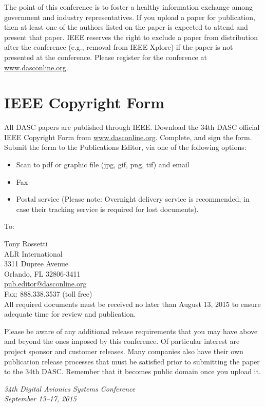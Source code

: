 \documentclass{dasc}
\begin{document}
The point of this conference is to foster a healthy information exchange among government and industry representatives.  If you upload a paper for publication, then at least one of the authors listed on the paper is expected to attend and present that paper.  IEEE reserves the right to exclude a paper from distribution after the conference (e.g., removal from IEEE Xplore) if the paper is not presented at the conference.  Please register for the conference at \url{www.dasconline.org}.

\section*{IEEE Copyright Form}

All DASC papers are published through IEEE.  Download the 34th DASC official IEEE Copyright Form from \url{www.dasconline.org}. Complete, and sign the form. Submit the form to the Publications Editor, via one of the following options: 
\begin{itemize}
\item Scan to pdf or graphic file (jpg, gif, png, tif) and email
\item Fax
\item Postal service (Please note: Overnight delivery service is recommended; in case their tracking service is required for lost documents).
\end{itemize}

\noindent To:

\noindent Tony Rossetti\\
ALR International\\
3311 Dupree Avenue\\
Orlando, FL 32806-3411\\
\url{pub.editor@dasconline.org}\\
Fax: 888.338.3537 (toll free)\\

All required documents must be received no later than August 13, 2015 to ensure adequate time for review and publication.

Please be aware of any additional release requirements that you may have above and beyond the ones imposed by this conference.  Of particular interest are project sponsor and customer releases.  Many companies also have their own publication release processes that must be satisfied prior to submitting the paper to the 34th DASC.  Remember that it becomes public domain once you upload it.

\printbibliography

\vspace{1cm}
\centering
\emph{\large 34th Digital Avionics Systems Conference\\September 13--17, 2015}
\end{document}
